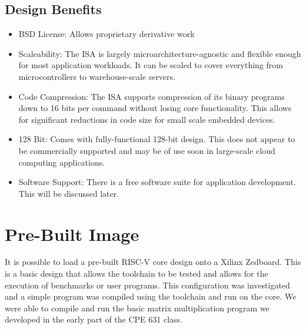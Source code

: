 \documentclass[journal]{IEEEtran}
\begin{document}
\subsection{Design Benefits}
\begin{itemize}
\item BSD License:\newline
  Allows proprietary derivative work
\item Scaleability:\newline
  The ISA is largely microarchitecture-agnostic and flexible enough for most application workloads. It can be scaled to cover everything from microcontrollers to warehouse-scale servers.
\item Code Compression:\newline
  The ISA supports compression of its binary programs down to 16 bits per command without losing core functionality. This allows for significant reductions in code size for small scale embedded devices.
\item 128 Bit:\newline
  Comes with fully-functional 128-bit design. This does not appear to be commercially supported and may be of use soon in large-scale cloud computing applications.
\item Software Support:\newline
  There is a free software suite for application development. This will be discussed later.
\end{itemize}

\section{Pre-Built Image}
It is possible to load a pre-built RISC-V core design onto a Xilinx Zedboard. This is a basic design that allows the toolchain to be tested and allows for the execution of benchmarks or user programs. This configuration was investigated and a simple program was compiled using the toolchain and run on the core. We were able to compile and run the basic matrix multiplication program we developed in the early part of the CPE 631 class.

\end{document}
